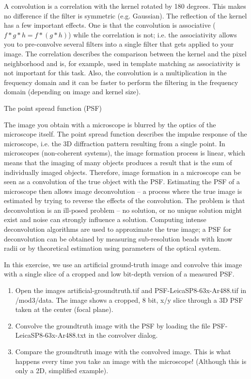 
A convolution is a correlation with the kernel rotated by 180 degrees. This makes no difference if the filter is symmetric (e.g. Gaussian). The reflection of the kernel has a few important effects. One is that the convolution is associative ($f * g * h = f * (g * h)$) while the correlation is not; i.e. the associativity allows you to pre-convolve several filters into a single filter that gets applied to your image. The correlation describes the comparison between the kernel and the pixel neighborhood and is, for example, used in template matching as associativity is not important for this task. Also, the convolution is a multiplication in the frequency domain and it can be faster to perform the filtering in the frequency domain (depending on image and kernel size). 

\begin{taskbox}{The point spread function (PSF)}

The image you obtain with a microscope is blurred by the optics of the microscope itself. The point spread  function describes the impulse response of the microscope, i.e. the 3D diffraction pattern resulting from a single point. In microscopes (non-coherent systems), the image formation process is linear, which means that the imaging of many objects produces a result that is the sum of individually imaged objects. Therefore, image formation in a microscope can be seen as a convolution of the true object with the PSF. Estimating the PSF of a microscope then allows image deconvolution -- a process where the true image is estimated by trying to reverse the effects of the convolution. The problem is that deconvolution is an ill-posed problem -- no solution, or no unique solution might exist and noise can strongly influence a solution. Computing intense deconvolution algorithms are used to approximate the true image; a PSF for deconvolution can be obtained by measuring sub-resolution beads with know radii or by theoretical estimation using parameters of the optical system. 

In this exercise, we use an artificial ground-truth image and convolve this image with a single slice of a cropped and low bit-depth version of a measured PSF. 

\begin{enumerate}
	\item Open the images artificial-groundtruth.tif and PSF-LeicaSP8-63x-Ar488.tif in /mod3/data. The image shows a cropped, 8 bit, x/y slice through a 3D PSF taken at the center (focal plane). 
	\item Convolve the groundtruth image with the PSF by loading the file PSF-LeicaSP8-63x-Ar488.txt in the convolver dialog.
	\item Compare the groundtruth image with the convolved image. This is what happens every time you take an image with the microscope! (Although this is only a 2D, simplified example).
	\end{enumerate}
\end{taskbox}

